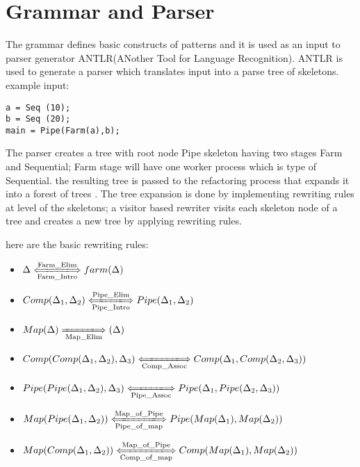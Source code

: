 \documentclass[12pt]{report}
\begin{document}
	
\title{}

\maketitle

\section{Grammar and Parser}
The grammar defines basic constructs of patterns and it is used as an input to parser generator ANTLR(ANother Tool for Language Recognition). ANTLR is used to generate a parser which translates input into a parse tree of skeletons. example input:

\begin{lstlisting}[style=refactor, caption={example input program},label={lst:code1}]
a = Seq (10);
b = Seq (20);
main = Pipe(Farm(a),b);
\end{lstlisting}
The parser creates a tree with root node Pipe skeleton having two stages Farm and Sequential; Farm stage will have one worker process which is type of Sequential. the resulting tree is passed to the refactoring process that expands it into a forest of trees . The tree expansion is done by implementing rewriting rules at level of the skeletons; a visitor based rewriter visits each skeleton node of a tree  and creates a new tree by applying rewriting rules. 

here are the basic rewriting rules:

\begin{itemize}
\item $\Delta \xLongleftrightarrow[\text{Farm\_Intro}]{\text{Farm\_Elim}} farm (\Delta)$\\
\item $Comp(\Delta_1, \Delta_2 )\xLongleftrightarrow[\text{Pipe\_Intro}]{\text{Pipe\_Elim}} Pipe (\Delta_1,\Delta_2)$\\
\item $Map(\Delta) \xLongrightarrow[\text{Map\_Elim}]{\text{}}  (\Delta)$\\
\item $Comp(Comp(\Delta_1, \Delta_2 ),\Delta_3)\xLongleftrightarrow[\text{Comp\_Assoc}]{\text{}} Comp (\Delta_1,Comp(\Delta_2,\Delta_3))$\\
\item $Pipe(Pipe(\Delta_1, \Delta_2 ),\Delta_3)\xLongleftrightarrow[\text{Pipe\_Assoc}]{\text{}} Pipe (\Delta_1,Pipe(\Delta_2,\Delta_3))$\\
\item $Map(Pipe(\Delta_1, \Delta_2 ))\xLongleftrightarrow[\text{Pipe\_of\_map}]{\text{Map\_of\_Pipe}} Pipe (Map(\Delta_1),Map(\Delta_2))$\\
\item $Map(Comp(\Delta_1, \Delta_2 ))\xLongleftrightarrow[\text{Comp\_of\_map}]{\text{Map\_of\_Pipe}} Comp (Map(\Delta_1),Map(\Delta_2))$\\
\end{itemize}
\end{document}
